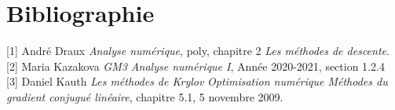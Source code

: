 \documentclass[12,french]{report}
\begin{document}
\chapter*{Bibliographie}

	[1] André Draux \textit{Analyse numérique}, poly, chapitre 2 \textit{Les méthodes de descente}.\\

	[2] Maria Kazakova \textit{GM3 Analyse numérique I}, Année 2020-2021, section 1.2.4\\ 
	
	[3] Daniel Kauth \textit{Les méthodes de Krylov} \textit{Optimisation numérique Méthodes du gradient conjugué linéaire}, chapitre 5.1, 5 novembre 2009.
\end{document}
